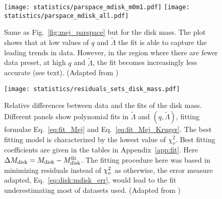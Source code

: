 \begin{figure}[t]
    \centering 
    \texttt{[image: statistics/parspace\_mdisk\_m0m1.pdf]}
    \texttt{[image: statistics/parspace\_mdisk\_all.pdf]}
    \caption{
        Same as Fig.~\ref{fig:mej_parspace} but for the disk mass.
        The plot shows that at low values of $q$ and $\tilde{\Lambda}$ the fit 
        is able to capture the leading trends in data. However, in the region where 
        there are fewer data preset, at high $q$ and $\tilde{\Lambda}$, the fit 
        becomes increasingly less accurate (see text).
        (Adapted from \citet{Nedora:2020qtd})
    }
    \label{fig:mdisk_parspace}
\end{figure}
%
\begin{figure}[t]
    \centering 
    \texttt{[image: statistics/residuals\_sets\_disk\_mass.pdf]}
    \caption{
        Relative differences between data and the fits of the disk mass. 
        Different panels show polynomial fits in $\tilde{\Lambda}$ and 
        $(q,\tilde{\Lambda})$, fitting formulae Eq.~\eqref{eq:fit_Mej} and 
        Eq.~\eqref{eq:fit_Mej_Kruger}. 
        The best fitting model is characterized by the lowest value of $\chi_{\nu}^2$.
        Best fitting coefficients are given in the tables in Appendix~\ref{app:fit}.
        Here $\Delta M_{\rm disk} = M_{\rm disk} - M^{\rm fit}_{\rm disk}$.
        The fitting procedure here was based in minimizing residuals instead 
        of $\chi_{\nu}^2$ as otherwise, the error measure adapted, 
        Eq.~\eqref{eq:disk:mdisk_err}, would lead to the 
        fit underestimating most of datasets used.
        (Adapted from \citet{Nedora:2020qtd})
    }
    \label{fig:stat_mdisk}
\end{figure}

 

